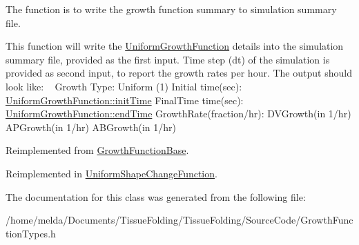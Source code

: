 The function is to write the growth function summary to simulation summary file. 

This function will write the \hyperlink{classUniformGrowthFunction}{Uniform\+Growth\+Function} details into the simulation summary file, provided as the first input. Time step (dt) of the simulation is provided as second input, to report the growth rates per hour. The output should look like\+: ~\newline
 Growth Type\+: Uniform (1) Initial time(sec)\+: \hyperlink{classGrowthFunctionBase_ae92513a7b41637df8e26e7db35ddf97c}{Uniform\+Growth\+Function\+::init\+Time} Final\+Time time(sec)\+: \hyperlink{classGrowthFunctionBase_a3ff4db0573d354a75666a5f3ca446941}{Uniform\+Growth\+Function\+::end\+Time} Growth\+Rate(fraction/hr)\+: D\+V\+Growth(in 1/hr) A\+P\+Growth(in 1/hr) A\+B\+Growth(in 1/hr)

Reimplemented from \hyperlink{classGrowthFunctionBase}{Growth\+Function\+Base}.



Reimplemented in \hyperlink{classUniformShapeChangeFunction_a196a7555899800406ee62714a20b34c4}{Uniform\+Shape\+Change\+Function}.



The documentation for this class was generated from the following file\+:\begin{DoxyCompactItemize}
\item 
/home/melda/\+Documents/\+Tissue\+Folding/\+Tissue\+Folding/\+Source\+Code/Growth\+Function\+Types.\+h\end{DoxyCompactItemize}
